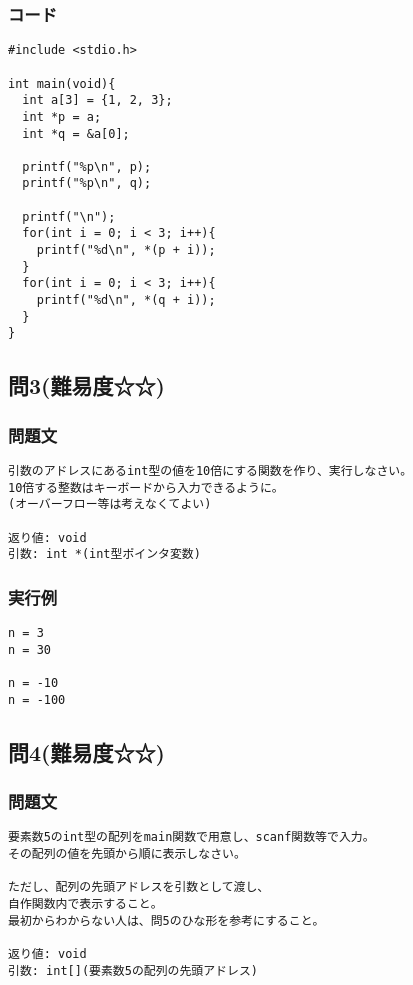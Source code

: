 \subsubsection{コード}
\begin{verbatim}
#include <stdio.h>

int main(void){
  int a[3] = {1, 2, 3};
  int *p = a;
  int *q = &a[0];

  printf("%p\n", p);
  printf("%p\n", q);

  printf("\n");
  for(int i = 0; i < 3; i++){
    printf("%d\n", *(p + i));
  }
  for(int i = 0; i < 3; i++){
    printf("%d\n", *(q + i));
  }
}

\end{verbatim}

\subsection{問3(難易度☆☆)}
\subsubsection{問題文}
\begin{verbatim}
引数のアドレスにあるint型の値を10倍にする関数を作り、実行しなさい。
10倍する整数はキーボードから入力できるように。
(オーバーフロー等は考えなくてよい)

返り値: void
引数: int *(int型ポインタ変数)
\end{verbatim}

\subsubsection{実行例}
\begin{verbatim}
n = 3
n = 30

n = -10
n = -100
\end{verbatim}

\subsection{問4(難易度☆☆)}
\subsubsection{問題文}
\begin{verbatim}
要素数5のint型の配列をmain関数で用意し、scanf関数等で入力。
その配列の値を先頭から順に表示しなさい。

ただし、配列の先頭アドレスを引数として渡し、
自作関数内で表示すること。
最初からわからない人は、問5のひな形を参考にすること。

返り値: void
引数: int[](要素数5の配列の先頭アドレス)
\end{verbatim}

